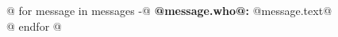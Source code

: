 \documentclass[a4paper]{article}
\begin{document}
@{ for message in messages -}@
\textbf{@{{message.who}}@:} @{{message.text}}@ \\
@{ endfor }@
\end{document}
